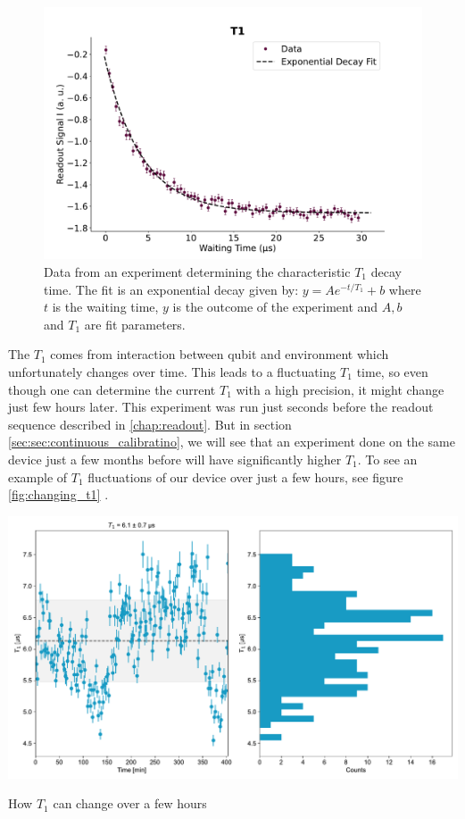 \begin{figure}
    \centering
    \includegraphics[]{Calibrations/Figures/T1.pdf}
    \caption{Data from an experiment determining the characteristic $T_1$ decay time. The fit is an exponential decay given by: $y = A e^{-t / T_1} + b$ where $t$ is the waiting time, $y$ is the outcome of the experiment and $A, b$ and $T_1$ are fit parameters.}
    \label{fig:calibration_T_1_decay}
\end{figure}

The $T_1$ comes from interaction between qubit and environment which unfortunately changes over time. This leads to a fluctuating $T_1$ time, so even though one can determine the current $T_1$ with a high precision, it might change just few hours later. This experiment was run just seconds before the readout sequence described in \ref{chap:readout}. But in section \ref{sec:sec:continuous_calibratino}, we will see that an experiment done on the same device just a few months before will have significantly higher $T_1$. To see an example of $T_1$ fluctuations of our device over just a few hours, see figure \ref{fig:changing_t1} . 
\begin{marginfigure}[-5 cm]
    \centering
    \includegraphics[]{Calibrations/Figures/T1_over_time.pdf}
    \caption{How $T_1$ can change over a few hours}
    \label{fig:changing_t1}
\end{marginfigure}

